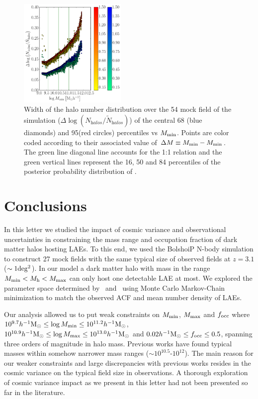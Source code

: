 \documentclass{emulateapj}
\newcommand{\hMsun}{{\ifmmode{h^{-1}{\rm {M_{\odot}}}}\else{$h^{-1}{\rm{M_{\odot}}}$}\fi}}
\newcommand{\mmin}{{\ifmmode{{M_{\rm min}}}\else{${M_{\rm min}}$}\fi}}
\newcommand{\mmax}{{\ifmmode{{M_{\rm max}}}\else{${M_{\rm max}}$}\fi}}
\begin{document}
\begin{figure}
\includegraphics[width=0.46\textwidth, height=0.33\textwidth]{mmin_dfocc1.png}
\caption{Width of the halo number distribution over the 54 mock field of the simulation ($\Delta \log \left( N_{\mathrm halos}/\tilde{N}_{\mathrm halos}\right)$) of the central 68 (blue diamonds) and  95(red circles)  percentiles vs $M_{\rm min}$. Points are color coded according to their associated value of $\Delta M \equiv M_{\rm min}-M_{\rm min}$. The green line diagonal line accounts for the 1:1 relation and the green vertical lines represent  the 16, 50 and 84 percentiles  of the posterior probability distribution of \mmin.}
\label{fig:cosmicv}
\end{figure}


\section{Conclusions}

In this letter we studied the impact of cosmic variance and observational uncertainties in constraining the mass range and  occupation fraction of dark matter halos hosting  LAEs.  
To this end, we used the BolshoiP N-body simulation to construct  27 mock fields  with the same typical size  of observed fields at  $z=3.1$ ($\sim 1 {\rm deg^2}$).  
In our model a dark matter halo with mass in the range $M_{\rm min}<M_{\mathrm h}<M_{\rm   max}$ can only host one detectable LAE at most. 
We explored the parameter space determined by \mmin\ and \mmax\ using Monte Carlo Markov-Chain minimization to match the observed  ACF and mean number density of LAEs. 

Our analysis allowed us to put weak constraints on $M_{\rm min}$, $M_{\rm max}$ and $f_{\rm occ}$ where $10^{9.7}\hMsun\leq \log M_{\rm min}\leq 10^{11.2}\hMsun$, $10^{10.9}\hMsun\leq \log M_{\rm max}\leq 10^{13.0}\hMsun$ and $0.02\hMsun\leq f_{\rm occ}\leq 0.5$, spanning three orders of magnitude in halo mass.
Previous works\citep{Hayashino2004, Gawiser07,Ouchi2008,Bielby16} have found typical masses within somehow narrower mass ranges ($\sim 10^{10.5}$-$10^{12}$).  
The main reason for our weaker constraints and large discrepancies with previous works resides in the cosmic variance on the typical field size in observations. 
A thorough exploration of cosmic variance impact as we present in this letter had not been presented so far in the literature.
\end{document}
